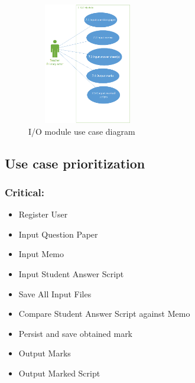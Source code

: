 \documentclass{article}
\begin{document}
\begin{enumerate}
\begin{itemize}
\begin{figure}[h]
								\centerline{\includegraphics[width=200px, height=200px]{io_module.png}}
								\caption{I/O module use case diagram}
								\end{figure}
					\end{itemize}
			
		\end{enumerate}
	\subsection{Use case prioritization}

		\subsubsection{Critical:}
			\begin{itemize}
				\item Register User
				\item Input Question Paper
				\item Input Memo
				\item Input Student Answer Script
				\item Save All Input Files
				\item Compare Student Answer Script against Memo
				\item Persist and save obtained mark
				\item Output Marks
				\item Output Marked Script
			\end{itemize}
\end{document}
